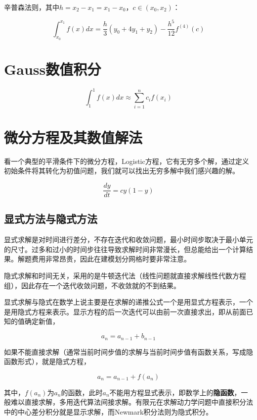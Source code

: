 辛普森法则，其中$ h=x_2-x_1=x_1-x_0 $，$ c\in(x_0,x_2) $：

\begin{equation}
\int_{x_0}^{x_1}f(x)dx = \frac{h}{3}(y_0 +4 y_1+y_2) - \frac{h^5}{12}f^{(4)}(c)
\end{equation}

\section{Gauss数值积分}

\begin{equation}
\int_1^1f(x)dx \approx \sum_{i=1}^n c_i f(x_i)
\end{equation}

\section{微分方程及其数值解法}

看一个典型的平滑条件下的微分方程，Logistic方程，它有无穷多个解，通过定义初始条件将其转化为初值问题，我们就可以找出无穷多解中我们感兴趣的解。

\[\frac{dy}{dt} = cy(1-y)\]

\subsection{显式方法与隐式方法}

显式求解是对时间进行差分，不存在迭代和收敛问题，最小时间步取决于最小单元的尺寸。过多和过小的时间步往往导致求解时间非常漫长，但总能给出一个计算结果。解题费用非常昂贵，因此在建模划分网格时要非常注意。

隐式求解和时间无关，采用的是牛顿迭代法（线性问题就直接求解线性代数方程组），因此存在一个迭代收敛问题，不收敛就的不到结果。

显式求解与隐式在数学上说主要是在求解的递推公式一个是用显式方程表示，一个是用隐式方程来表示。显示方程的后一次迭代可以由前一次直接求出，即从前面已知的值确定新值，

\[a_n=a_{n-1}+b_{n-1} \]

如果不能直接求解（通常当前时间步值的求解与当前时间步值有函数关系，写成隐函数形式），就是隐式方程，

\[a_n=a_{n-1}+f(a_n)\]

其中，$ f(a_n) $为$ a_n $的函数，此时$ a_n $不能用方程显式表示，即数学上的\textbf{隐函数}，一般难以直接求解，多用迭代算法间接求解。有限元在求解动力学问题中直接积分法中的中心差分积分就是显示求解，而Newmark积分法则为隐式积分。

